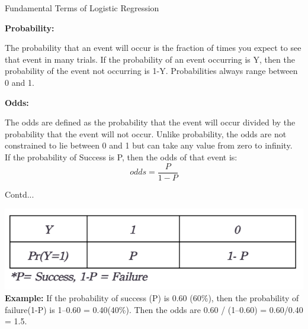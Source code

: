 \documentclass{beamer}
\newcommand\myheading[1]{%
  \par\bigskip
  {\Large\bfseries#1}\par\smallskip}
\begin{document}
\begin{frame}{Fundamental Terms of Logistic Regression}
\begin{flushleft}
\myheading{Probability:}
		The probability that an event will occur is the fraction of times you expect to see that event in many trials. If the probability of an event occurring is Y, then the probability of the event not occurring is 1-Y. Probabilities always range between 0 and 1.
\myheading{Odds:}
	The odds are defined as the probability that the event will occur divided by the probability that the event will not occur. Unlike probability, the odds are not constrained to lie between 0 and 1 but can take any value from zero to infinity.\\
\vspace{10pt}
If the probability of Success is P, then the odds of that event is:
\begin{equation*}
	odds = \frac{P}{1-P}
\end{equation*}
\end{flushleft}
\end{frame}

\begin{frame}{Contd...}
\begin{flushleft}
	\includegraphics[scale=0.5]{table}
		\textbf{Example:} If the probability of success (P) is 0.60 (60\%), then the probability of failure(1-P) is 1–0.60 = 0.40(40\%). Then the odds are 0.60 / (1–0.60) = 0.60/0.40 = 1.5.

\end{flushleft}
\end{frame}
\end{document}
